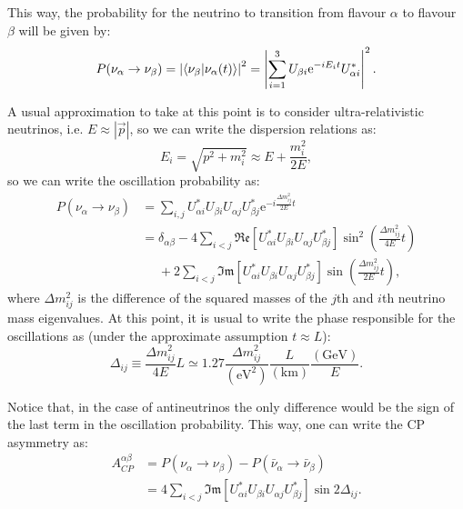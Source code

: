 This way, the probability for the neutrino to transition from flavour $\alpha$ to flavour $\beta$ will be given by:
\begin{equation}\label{2.5}
P(\nu_{\alpha} \rightarrow \nu_{\beta}) = \left|\braket{\nu_{\beta}}{\nu_{\alpha}(t)}\right|^{2}=\left|\sum_{i=1}^{3} U_{\beta i} \mathrm{e}^{-iE_{i}t} U^{*}_{\alpha i}\right|^{2}.
\end{equation}

A usual approximation to take at this point is to consider ultra-relativistic neutrinos, i.e. $E \approx \left|\vec{p}\right|$, so we can write the dispersion relations as:
\begin{equation}\label{2.6}
E_{i} = \sqrt{p^{2} + m_{i}^{2}} \approx E + \frac{m_{i}^{2}}{2 E},
\end{equation}
so we can write the oscillation probability as:
\begin{equation}\label{2.7}
\begin{split}
P(\nu_{\alpha} \rightarrow \nu_{\beta}) &= \sum_{i,j} U^{*}_{\alpha i} U_{\beta i} U_{\alpha j} U^{*}_{\beta j} \mathrm{e}^{-i\frac{\Delta m^{2}_{ij}}{2E}t}\\
&=\delta_{\alpha\beta} - 4 \sum_{i<j} \mathfrak{Re}\left[U^{*}_{\alpha i} U_{\beta i} U_{\alpha j} U^{*}_{\beta j}\right] \sin^{2}\left(\frac{\Delta m^{2}_{ij}}{4E}t\right)\\
&\phantom{=}+ 2  \sum_{i<j} \mathfrak{Im}\left[U^{*}_{\alpha i} U_{\beta i} U_{\alpha j} U^{*}_{\beta j}\right] \sin\left(\frac{\Delta m^{2}_{ij}}{2E}t\right),
\end{split}
\end{equation}
where $\Delta m^{2}_{ij}$ is the difference of the squared masses of the $j$th and $i$th neutrino mass eigenvalues. At this point, it is usual to write the phase responsible for the oscillations as (under the approximate assumption $t \approx L$):
\begin{equation}\label{2.8}
\Delta_{ij} \equiv \frac{\Delta m^{2}_{ij}}{4E}L \simeq 1.27 \frac{\Delta m^{2}_{ij}}{(\mathrm{eV}^{2})} \frac{L}{(\mathrm{km})} \frac{(\mathrm{GeV})}{E}.
\end{equation}

Notice that, in the case of antineutrinos the only difference would be the sign of the last term in the oscillation probability. This way, one can write the CP asymmetry as:
\begin{equation}\label{2.9}
\begin{split}
A^{\alpha\beta}_{CP}&=P(\nu_{\alpha} \rightarrow \nu_{\beta})-P(\bar{\nu}_{\alpha} \rightarrow \bar{\nu}_{\beta})\\
&=4  \sum_{i<j} \mathfrak{Im}\left[U^{*}_{\alpha i} U_{\beta i} U_{\alpha j} U^{*}_{\beta j}\right] \sin 2\Delta_{ij}.
\end{split}
\end{equation}

